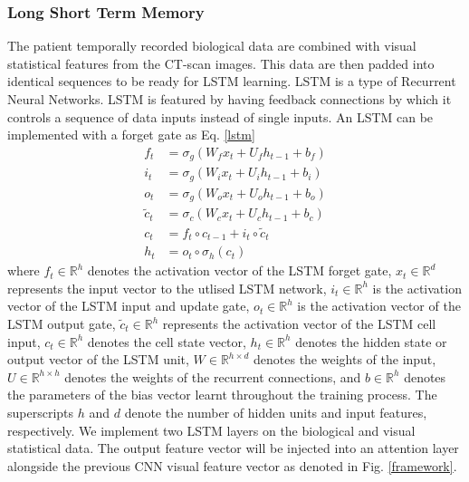 \documentclass[conference]{IEEEtran}
\begin{document}
\subsubsection{Long Short Term Memory}
The patient temporally recorded biological data are combined with visual statistical features from the CT-scan images. This data are then padded into identical sequences to be ready for LSTM learning. LSTM is a type of Recurrent Neural Networks. LSTM is featured by having feedback connections by which it controls a sequence of data inputs instead of single inputs. An LSTM can be implemented with a forget gate as Eq. \ref{lstm}
\begin{equation}\label{lstm}
\begin{aligned}
f_{t} &=\sigma_{g}\left(W_{f} x_{t}+U_{f} h_{t-1}+b_{f}\right) \\
i_{t} &=\sigma_{g}\left(W_{i} x_{t}+U_{i} h_{t-1}+b_{i}\right) \\
o_{t} &=\sigma_{g}\left(W_{o} x_{t}+U_{o} h_{t-1}+b_{o}\right) \\
\tilde{c}_{t} &=\sigma_{c}\left(W_{c} x_{t}+U_{c} h_{t-1}+b_{c}\right) \\
c_{t} &=f_{t} \circ c_{t-1}+i_{t} \circ \tilde{c}_{t} \\
h_{t} &=o_{t} \circ \sigma_{h}\left(c_{t}\right)
\end{aligned}
\end{equation}
where 
$f_{t} \in \mathbb{R}^{h}$ denotes the activation vector of the LSTM forget gate,
$x_{t} \in \mathbb{R}^{d}$ represents the input vector to the utlised LSTM network, 
$i_{t} \in \mathbb{R}^{h}$ is the activation vector of the LSTM input and update gate,
$o_{t} \in \mathbb{R}^{h}$ is the activation vector of the LSTM output gate, 
$\tilde{c}_{t} \in \mathbb{R}^{h}$ represents the activation vector of the LSTM cell input, 
$c_{t} \in \mathbb{R}^{h}$ denotes the cell state vector, 
$h_{t} \in \mathbb{R}^{h}$ denotes the hidden state or output vector of the LSTM unit,
$W \in \mathbb{R}^{h \times d}$ denotes the weights of the input, 
$U \in \mathbb{R}^{h \times h}$ denotes the weights of the recurrent connections, and 
$b \in \mathbb{R}^{h}$ denotes the parameters of the bias vector learnt throughout the training process. The superscripts $h$ and $d$ denote the number of hidden units and input features, respectively. We implement two LSTM layers on the biological and visual statistical data. The output feature vector will be injected into an attention layer alongside the previous CNN visual feature vector as denoted in Fig. \ref{framework}. %
\end{document}
